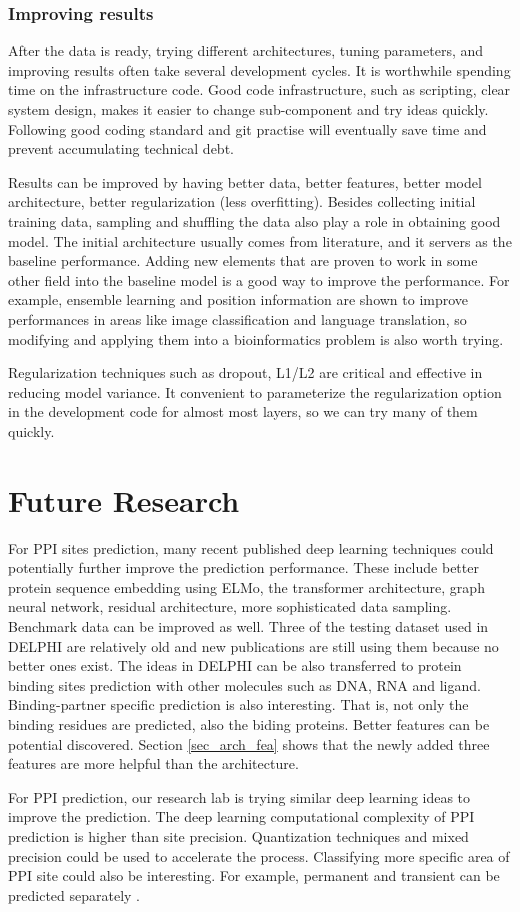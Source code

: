 \subsubsection{Improving results}
After the data is ready, trying different architectures, tuning parameters, and improving results often take several development cycles. It is worthwhile spending time on the infrastructure code. Good code infrastructure, such as scripting, clear system design, makes it easier to change sub-component and try ideas quickly. Following good coding standard and git practise will eventually save time and prevent accumulating technical debt.

Results can be improved by having better data, better features, better model architecture, better regularization (less overfitting). Besides collecting initial training data, sampling and shuffling the data also play a role in obtaining good model. The initial architecture usually comes from literature, and it servers as the baseline performance. Adding new elements that are proven to work in some other field into the baseline model is a good way to improve the performance. For example, ensemble learning and position information are shown to improve performances in areas like image classification and language translation, so modifying and applying them into a bioinformatics problem is also worth trying.

Regularization techniques such as dropout, L1/L2 are critical and effective in reducing model variance. It convenient to parameterize the regularization option in the development code for almost most layers, so we can try many of them quickly.
\section{Future Research}
For PPI sites prediction, many recent published deep learning techniques could potentially further improve the prediction performance. These include better protein sequence embedding using ELMo, the transformer architecture, graph neural network, residual architecture, more sophisticated data sampling. Benchmark data can be improved as well. Three of the testing dataset used in DELPHI are relatively old and new publications are still using them because no better ones exist. The ideas in DELPHI can be also transferred to protein binding sites prediction with other molecules such as DNA, RNA and ligand. Binding-partner specific prediction is also interesting. That is, not only the binding residues are predicted, also the biding proteins. Better features can be potential discovered. Section \ref{sec_arch_fea} shows that the newly added three features are more helpful than the architecture. 

For PPI prediction, our research lab is trying similar deep learning ideas to improve the prediction. The deep learning computational complexity of PPI prediction is higher than site precision. Quantization techniques and mixed precision could be used to accelerate the process. Classifying more specific area of PPI site could also be interesting. For example,  permanent and transient can be predicted separately \cite{perkins2010transient}. 